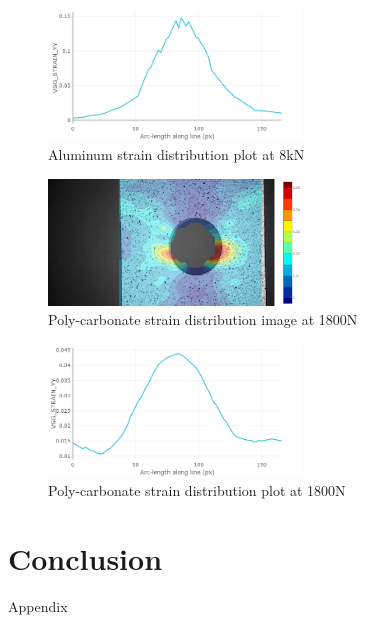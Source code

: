 \documentclass{article}
\begin{document}
\begin{figure}[H]
    \centering
    \includegraphics[width = 0.6\textwidth]{lab9images/8kNplot_Al_strainyy.png}
    \caption{Aluminum strain distribution plot at 8kN}
    \label{fig:al8kNplot}
\end{figure}

\begin{figure}[H]
    \centering
    \includegraphics[width = 0.6\textwidth]{lab9images/1800Npccolored_strainyy.PNG}
    \caption{Poly-carbonate strain distribution image at 1800N}
    \label{fig:PC1800Npic}
\end{figure}

\begin{figure}[H]
    \centering
    \includegraphics[width = 0.6\textwidth]{lab9images/1800Npcplot_strainyy.png}
    \caption{Poly-carbonate strain distribution plot at 1800N}
    \label{fig:PC1800Nplot}
\end{figure}
 
\section{Conclusion}



\newpage
\thispagestyle{empty}  %
\begin{center}
	\vspace*{\fill}
	{\Huge Appendix}
	\vspace*{\fill}
\end{center}
\end{document}
